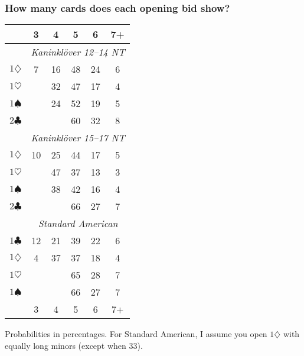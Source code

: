 \documentclass[a4paper, twoside, 11pt]{article}
\begin{document}
\begin{multicols}{3}
\subsubsection*{How many cards does each opening bid show?}
\begin{center}
\begin{tabular}{ |r|ccccc| }
\hline
  & 3 & 4 & 5 & 6 & 7+ \\
 \hline
& \multicolumn{5}{|c|}{\textit{Kaninklöver 12--14 NT}} \\
$1\diamondsuit$ & 7 & 16 & 48 & 24 & 6 \\
$1\heartsuit$ & & 32 & 47 & 17 & 4 \\
 $1\spadesuit$ & & 24 & 52 & 19 & 5 \\
$2\clubsuit$ & & & 60 & 32 & 8 \\
 \hline
 & \multicolumn{5}{|c|}{\textit{Kaninklöver 15--17 NT}} \\
$1\diamondsuit$ & 10 & 25 & 44 & 17 & 5 \\
$1\heartsuit$ & & 47 & 37 & 13 & 3 \\
 $1\spadesuit$ & & 38 & 42 & 16 & 4 \\
$2\clubsuit$ & & & 66 & 27 & 7 \\
 \hline
 & \multicolumn{5}{|c|}{\textit{Standard American}} \\
$1\clubsuit$ & 12 & 21 & 39 & 22 & 6 \\
$1\diamondsuit$ & 4 & 37 & 37 & 18 & 4 \\
$1\heartsuit$ & & & 65 & 28 & 7 \\
$1\spadesuit$ & & & 66 & 27 & 7  \\
\hline
  & 3 & 4 & 5 & 6 & 7+ \\
 \hline
\end{tabular}
\end{center}



Probabilities in percentages. For Standard American, I assume you open $1\diamondsuit$ with equally long minors (except when 33).

\end{multicols}
\end{document}
